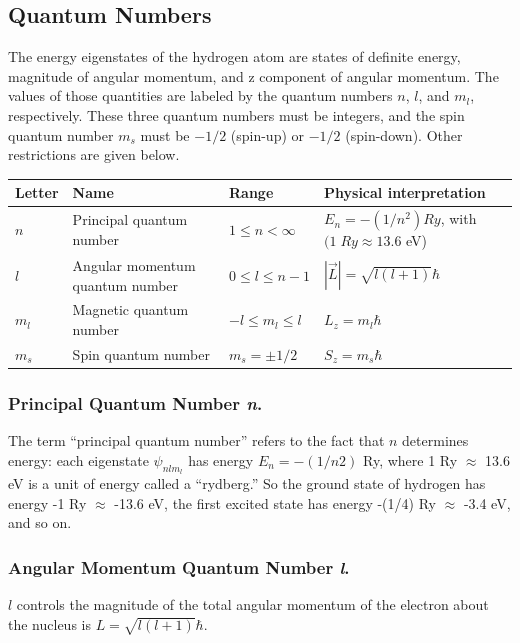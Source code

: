 \documentclass[../../../main.tex]{subfiles}
\begin{document}
\subsection{Quantum Numbers}
The energy eigenstates of the hydrogen atom are states of definite energy, magnitude of angular momentum, and z component of angular momentum. The values of those quantities are labeled by the quantum numbers $n$, $l$, and $m_l$, respectively. These three quantum numbers must be integers, and the spin quantum number $m_s$ must be $-1/2$ (spin-up) or $-1/2$ (spin-down). Other restrictions are given below.
\begin{center}
    \begin{tabular}{| p{} | p{} | p{} | p{}|}
        \hline
        Letter&Name&Range&Physical interpretation\\
        \hline
        $n$&Principal quantum number&$1 \leq n <\infty$&$E_n = -(1/n^2) Ry$, with $ (1 \;Ry \approx 13.6$ eV)\\
        $l$&Angular momentum quantum number&$0 \leq l \leq n - 1$ &$ |\overrightarrow{L}| = \sqrt{l(l + 1) }\hbar$\\
        $m_l$&Magnetic quantum number&$-l \leq m_l \leq l$&$L_z = m_l\hbar$\\
        $m_s$&Spin quantum number&$m_s = \pm 1/2$&$S_z = m_s\hbar$\\\hline
    \end{tabular}
\end{center}

\subsubsection{Principal Quantum Number \emph{n}.} The term “principal quantum number” refers to the fact that $n$ determines energy: each eigenstate $\psi_{nlm_l}$  has energy $E_n = -(1/n2)$ Ry, where 1 Ry $\approx$ 13.6 eV is a unit of energy called a “rydberg.” So the ground state of hydrogen has energy -1 Ry $\approx$ -13.6 eV, the first excited state has energy -(1/4) Ry $\approx$ -3.4 eV, and so on.

\subsubsection{Angular Momentum Quantum Number \emph{l}.} $l$ controls the magnitude of the total angular momentum of the electron about the nucleus is $L = \sqrt{l(l + 1)} \hbar$.
\end{document}
